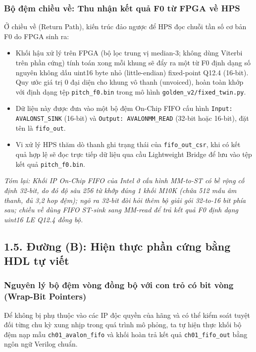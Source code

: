 \subsubsection*{Bộ đệm chiều về: Thu nhận kết quả F0 từ FPGA về HPS}
Ở chiều về (Return Path), kiến trúc đảo ngược để HPS đọc chuỗi tần số cơ bản F0 do FPGA sinh ra:
\begin{itemize}[leftmargin=1.5em, itemsep=2pt]
    \item Khối hậu xử lý trên FPGA (bộ lọc trung vị median-3; không dùng Viterbi trên phần cứng) tính toán xong mỗi khung sẽ đẩy ra một từ F0 định dạng số nguyên không dấu uint16 byte nhỏ (little-endian) fixed-point Q12.4 (16-bit). Quy ước giá trị $0$ đại diện cho khung vô thanh (unvoiced), hoàn toàn khớp với định dạng tệp \texttt{pitch\_f0.bin} trong mô hình \texttt{golden\_v2/fixed\_twin.py}.
    \item Dữ liệu này được đưa vào một bộ đệm On-Chip FIFO cấu hình \texttt{Input: AVALONST\_SINK} (16-bit) và \texttt{Output: AVALONMM\_READ} (32-bit hoặc 16-bit), đặt tên là \texttt{fifo\_out}.
    \item Vi xử lý HPS thăm dò thanh ghi trạng thái của \texttt{fifo\_out\_csr}, khi có kết quả hợp lệ sẽ đọc trực tiếp dữ liệu qua cầu Lightweight Bridge để lưu vào tệp kết quả \texttt{pitch\_f0.bin}.
\end{itemize}

\textit{Tóm lại: Khối IP On-Chip FIFO của Intel ở cấu hình MM-to-ST có bề rộng cố định 32-bit, do đó độ sâu 256 từ khớp đúng 1 khối M10K (chứa 512 mẫu âm thanh, đủ 3,2 hop đệm); ngõ ra 32-bit đòi hỏi thêm bộ giải gói 32-to-16 bit phía sau; chiều về dùng FIFO ST-sink sang MM-read để trả kết quả F0 định dạng uint16 LE Q12.4 đồng bộ.}

\subsection*{1.5. Đường (B): Hiện thực phần cứng bằng HDL tự viết}

\subsubsection*{Nguyên lý bộ đệm vòng đồng bộ với con trỏ có bit vòng (Wrap-Bit Pointers)}
Để không bị phụ thuộc vào các IP độc quyền của hãng và có thể kiểm soát tuyệt đối từng chu kỳ xung nhịp trong quá trình mô phỏng, ta tự hiện thực khối bộ đệm nạp mẫu \texttt{ch01\_avalon\_fifo} và khối hoàn trả kết quả \texttt{ch01\_fifo\_out} bằng ngôn ngữ Verilog chuẩn.

